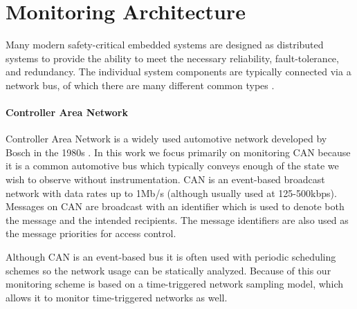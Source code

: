 
\section{Monitoring Architecture}

Many modern safety-critical embedded systems are designed as distributed systems to provide the ability to meet the necessary reliability, fault-tolerance, and redundancy. The individual system components are typically connected via a network bus, of which there are many different common types \cite{Rushby2001}. %
%
\paragraph{Controller Area Network} %
Controller Area Network is a widely used automotive network developed by Bosch in the 1980s \cite{Bosch1991}. 
In this work we focus primarily on monitoring CAN because it is a common automotive bus which typically conveys enough of the state we wish to observe without instrumentation.
%
CAN is an event-based broadcast network with data rates up to 1Mb/s (although usually used at 125-500kbps). Messages on CAN are broadcast with an identifier which is used to denote both the message and the intended recipients. The message identifiers are also used as the message priorities for access control.

Although CAN is an event-based bus it is often used with periodic scheduling schemes so the network usage can be statically analyzed. Because of this our monitoring scheme is based on a time-triggered network sampling model, which allows it to monitor time-triggered networks as well.

